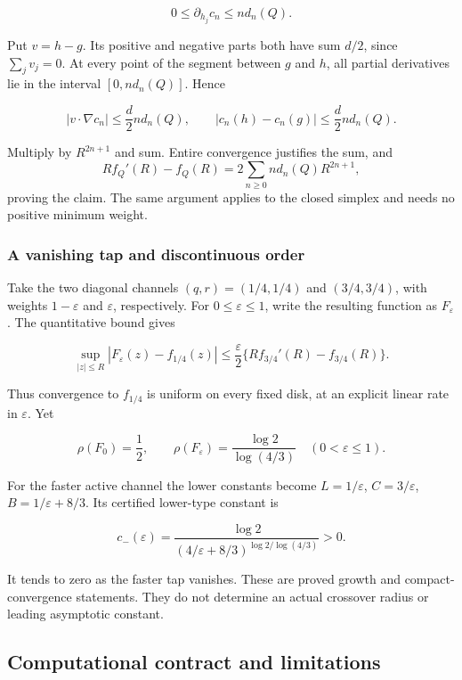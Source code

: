 \[
0\le\partial_{h_j}c_n\le n d_n(Q).
\]

Put \(v=h-g\). Its positive and negative parts both have sum \(d/2\),
since \(\sum_jv_j=0\). At every point of the segment between \(g\) and
\(h\), all partial derivatives lie in the interval \([0,n d_n(Q)]\).
Hence

\[
|v\cdot\nabla c_n|\le\frac d2 n d_n(Q),\qquad
|c_n(h)-c_n(g)|\le\frac d2 n d_n(Q).
\]

Multiply by \(R^{2n+1}\) and sum. Entire convergence justifies the sum,
and
\[R f_Q'(R)-f_Q(R)=2\sum_{n\ge0}n d_n(Q)R^{2n+1},\]
proving the
claim. The same argument applies to the closed simplex and needs no
positive minimum weight.

\hypertarget{a-vanishing-tap-and-discontinuous-order}{%
\subsubsection{A vanishing tap and discontinuous
order}\label{a-vanishing-tap-and-discontinuous-order}}

Take the two diagonal channels \((q,r)=(1/4,1/4)\) and \((3/4,3/4)\),
with weights \(1-\varepsilon\) and \(\varepsilon\), respectively. For
\(0\le\varepsilon\le1\), write the resulting function as
\(F_\varepsilon\). The quantitative bound gives

\[
\sup_{|z|\le R}|F_\varepsilon(z)-f_{1/4}(z)|
\le\frac{\varepsilon}{2}\{R f_{3/4}'(R)-f_{3/4}(R)\}.
\]

Thus convergence to \(f_{1/4}\) is uniform on every fixed disk, at an
explicit linear rate in \(\varepsilon\). Yet

\[
\rho(F_0)=\frac12,\qquad
\rho(F_\varepsilon)=\frac{\log2}{\log(4/3)}
\quad(0<\varepsilon\le1).
\]

For the faster active channel the lower constants become
\(L=1/\varepsilon\), \(C=3/\varepsilon\), \(B=1/\varepsilon+8/3\). Its
certified lower-type constant is

\[
c_-(\varepsilon)=\frac{\log2}{(4/\varepsilon+8/3)^{\log2/\log(4/3)}}>0.
\]

It tends to zero as the faster tap vanishes. These are proved growth and
compact-convergence statements. They do not determine an actual
crossover radius or leading asymptotic constant.

\hypertarget{computational-contract-and-limitations}{%
\subsection{Computational contract and
limitations}\label{computational-contract-and-limitations}}

